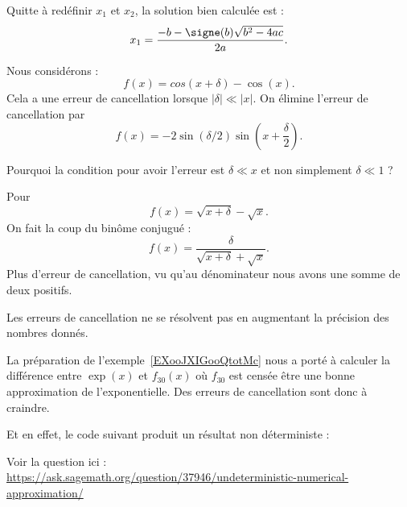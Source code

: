 Quitte à redéfinir \( x_1\) et \( x_2\), la solution bien calculée est :
\begin{equation}
	x_1=\frac{ -b-\signe(b)\sqrt{b^2-4ac} }{ 2a }.
\end{equation}

\begin{example}
	Nous considérons :
	\begin{equation}
		f(x)=cos(x+\delta)-\cos(x).
	\end{equation}
	Cela a une erreur de cancellation lorsque \( | \delta |\ll | x |\). On élimine l'erreur de cancellation par
	\begin{equation}
		f(x)=-2\sin(\delta/2)\sin\left( x+\frac{ \delta }{ 2 } \right).
	\end{equation}

	\begin{probleme}
		Pourquoi la condition pour avoir l'erreur est \( \delta\ll x\) et non simplement \( \delta\ll 1\) ?
	\end{probleme}

\end{example}

\begin{example}
	Pour
	\begin{equation}
		f(x)=\sqrt{x+\delta}-\sqrt{x}.
	\end{equation}
	On fait la coup du binôme conjugué :
	\begin{equation}
		f(x)=\frac{ \delta }{ \sqrt{x+\delta}+\sqrt{x} }.
	\end{equation}
	Plus d'erreur de cancellation, vu qu'au dénominateur nous avons une somme de deux positifs.
\end{example}

Les erreurs de cancellation ne se résolvent pas en augmentant la précision des nombres donnés.

\begin{example}
	La préparation de l'exemple~\ref{EXooJXIGooQtotMc} nous a porté à calculer la différence entre \( \exp(x)\) et \( f_{30}(x)\) où \( f_{30}\) est censée être une bonne approximation de l'exponentielle. Des erreurs de cancellation sont donc à craindre.

	Et en effet, le code suivant produit un résultat non déterministe :
	

	Voir la question ici :\\ \url{https://ask.sagemath.org/question/37946/undeterministic-numerical-approximation/}

\end{example}

